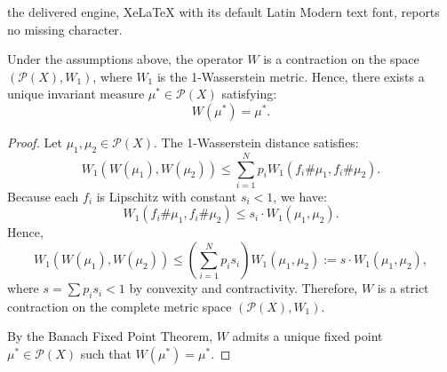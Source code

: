 \documentclass[10pt,a4paper]{amsart}
\begin{document}
the delivered engine, XeLaTeX with its default Latin Modern text font, reports no missing character.
\begin{theorem}
\label{thm:invariant_measure}
Under the assumptions above, the operator $W$ is a contraction on the space $(\mathcal{P}(X), W_1)$, where $W_1$ is the 1-Wasserstein metric. Hence, there exists a unique invariant measure $\mu^* \in \mathcal{P}(X)$ satisfying:
\[
W(\mu^*) = \mu^*.
\]
\end{theorem}

\begin{proof}
Let $\mu_1, \mu_2 \in \mathcal{P}(X)$. The 1-Wasserstein distance satisfies:
\[
W_1(W(\mu_1), W(\mu_2)) \leq \sum_{i=1}^N p_i W_1(f_i\#\mu_1, f_i\#\mu_2).
\]
Because each $f_i$ is Lipschitz with constant $s_i < 1$, we have:
\[
W_1(f_i\#\mu_1, f_i\#\mu_2) \leq s_i \cdot W_1(\mu_1, \mu_2).
\]
Hence,
\[
W_1(W(\mu_1), W(\mu_2)) \leq \left( \sum_{i=1}^N p_i s_i \right) W_1(\mu_1, \mu_2) := s \cdot W_1(\mu_1, \mu_2),
\]
where $s = \sum p_i s_i < 1$ by convexity and contractivity. Therefore, $W$ is a strict contraction on the complete metric space $(\mathcal{P}(X), W_1)$.

By the Banach Fixed Point Theorem, $W$ admits a unique fixed point $\mu^* \in \mathcal{P}(X)$ such that $W(\mu^*) = \mu^*$.
\end{proof}
\end{document}
